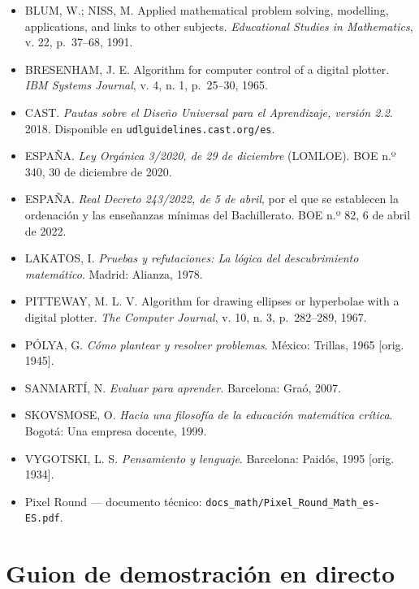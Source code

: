 \documentclass[12pt,a4paper]{scrartcl}
\begin{document}
\begin{itemize}[leftmargin=1.3em,itemsep=0.2em,topsep=0.3em]
  \item BLUM, W.; NISS, M. Applied mathematical problem solving, modelling, applications, and links to other subjects. \emph{Educational Studies in Mathematics}, v. 22, p.~37--68, 1991.
  \item BRESENHAM, J. E. Algorithm for computer control of a digital plotter. \emph{IBM Systems Journal}, v. 4, n. 1, p.~25--30, 1965.
  \item CAST. \emph{Pautas sobre el Diseño Universal para el Aprendizaje, versión 2.2}. 2018. Disponible en \texttt{udlguidelines.cast.org/es}.
  \item ESPAÑA. \emph{Ley Orgánica 3/2020, de 29 de diciembre} (LOMLOE). BOE n.º 340, 30 de diciembre de 2020.
  \item ESPAÑA. \emph{Real Decreto 243/2022, de 5 de abril}, por el que se establecen la ordenación y las enseñanzas mínimas del Bachillerato. BOE n.º 82, 6 de abril de 2022.
  \item LAKATOS, I. \emph{Pruebas y refutaciones: La lógica del descubrimiento matemático}. Madrid: Alianza, 1978.
  \item PITTEWAY, M. L. V. Algorithm for drawing ellipses or hyperbolae with a digital plotter. \emph{The Computer Journal}, v. 10, n. 3, p.~282--289, 1967.
  \item PÓLYA, G. \emph{Cómo plantear y resolver problemas}. México: Trillas, 1965 [orig. 1945].
  \item SANMARTÍ, N. \emph{Evaluar para aprender}. Barcelona: Graó, 2007.
  \item SKOVSMOSE, O. \emph{Hacia una filosofía de la educación matemática crítica}. Bogotá: Una empresa docente, 1999.
  \item VYGOTSKI, L. S. \emph{Pensamiento y lenguaje}. Barcelona: Paidós, 1995 [orig. 1934].
  \item Pixel Round --- documento técnico: \texttt{docs\_math/Pixel\_Round\_Math\_es-ES.pdf}.
\end{itemize}

\newpage
\appendix
\renewcommand{\thesection}{\Alph{section}}
\setcounter{section}{0}

\section{Guion de demostración en directo}\label{ap:guion}
\end{document}

